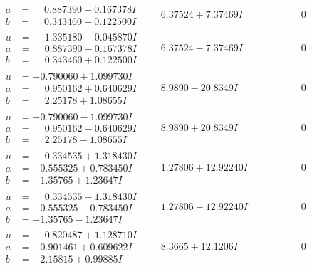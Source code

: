 \documentclass[1p]{elsarticle_modified}
\theoremstyle{definition}
\begin{document}
$$\begin{array}{c|c|c}
\begin{aligned}
a &= \phantom{-}0.887390 + 0.167378 I \\
b &= \phantom{-}0.343460 - 0.122500 I\end{aligned}
 & \phantom{-}6.37524 + 7.37469 I & \phantom{-0.000000 } 0 \\ \hline\begin{aligned}
u &= \phantom{-}1.335180 - 0.045870 I \\
a &= \phantom{-}0.887390 - 0.167378 I \\
b &= \phantom{-}0.343460 + 0.122500 I\end{aligned}
 & \phantom{-}6.37524 - 7.37469 I & \phantom{-0.000000 } 0 \\ \hline\begin{aligned}
u &= -0.790060 + 1.099730 I \\
a &= \phantom{-}0.950162 + 0.640629 I \\
b &= \phantom{-}2.25178 + 1.08655 I\end{aligned}
 & \phantom{-}8.9890 - 20.8349 I & \phantom{-0.000000 } 0 \\ \hline\begin{aligned}
u &= -0.790060 - 1.099730 I \\
a &= \phantom{-}0.950162 - 0.640629 I \\
b &= \phantom{-}2.25178 - 1.08655 I\end{aligned}
 & \phantom{-}8.9890 + 20.8349 I & \phantom{-0.000000 } 0 \\ \hline\begin{aligned}
u &= \phantom{-}0.334535 + 1.318430 I \\
a &= -0.555325 + 0.783450 I \\
b &= -1.35765 + 1.23647 I\end{aligned}
 & \phantom{-}1.27806 + 12.92240 I & \phantom{-0.000000 } 0 \\ \hline\begin{aligned}
u &= \phantom{-}0.334535 - 1.318430 I \\
a &= -0.555325 - 0.783450 I \\
b &= -1.35765 - 1.23647 I\end{aligned}
 & \phantom{-}1.27806 - 12.92240 I & \phantom{-0.000000 } 0 \\ \hline\begin{aligned}
u &= \phantom{-}0.820487 + 1.128710 I \\
a &= -0.901461 + 0.609622 I \\
b &= -2.15815 + 0.99885 I\end{aligned}
 & \phantom{-}8.3665 + 12.1206 I & \phantom{-0.000000 } 0 \\ \hline\begin{aligned}

\end{aligned}
\end{array}$$
\end{document}
